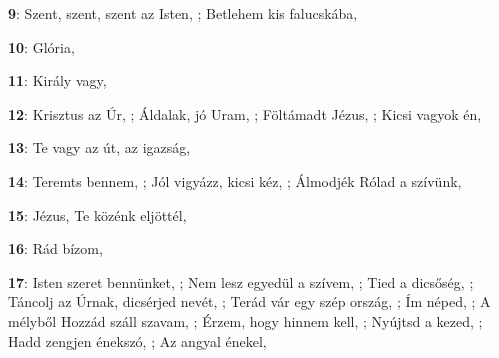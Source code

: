\begin{minipage}{0.5\textwidth}
\textbf{9}: Szent, szent, szent az Isten, \pageref{Szent2Cszent2CszentazIsten}; Betlehem kis falucskába, \pageref{BetlehemkisfalucskC3A1ba}
\end{minipage}\vspace{0.1cm}
\begin{minipage}{0.5\textwidth}
\textbf{10}: Glória, \pageref{GlC3B3ria}
\end{minipage}\vspace{0.1cm}
\begin{minipage}{0.5\textwidth}
\textbf{11}: Király vagy, \pageref{KirC3A1lyvagy}
\end{minipage}\vspace{0.1cm}
\begin{minipage}{0.5\textwidth}
\textbf{12}: Krisztus az Úr, \pageref{KrisztusazC39Ar}; Áldalak, jó Uram, \pageref{C381ldalak2CjC3B3Uram}; Föltámadt Jézus, \pageref{FC3B6ltC3A1madtJC3A9zus}; Kicsi vagyok én, \pageref{KicsivagyokC3A9n}
\end{minipage}\vspace{0.1cm}
\begin{minipage}{0.5\textwidth}
\textbf{13}: Te vagy az út, az igazság, \pageref{TevagyazC3BAt2CazigazsC3A1g}
\end{minipage}\vspace{0.1cm}
\begin{minipage}{0.5\textwidth}
\textbf{14}: Teremts bennem, \pageref{Teremtsbennem}; Jól vigyázz, kicsi kéz, \pageref{JC3B3lvigyC3A1zz2CkicsikC3A9z}; Álmodjék Rólad a szívünk, \pageref{C381lmodjC3A9kRC3B3ladaszC3ADvC3BCnk}
\end{minipage}\vspace{0.1cm}
\begin{minipage}{0.5\textwidth}
\textbf{15}: Jézus, Te közénk eljöttél, \pageref{JC3A9zus2CTekC3B6zC3A9nkeljC3B6ttC3A9l}
\end{minipage}\vspace{0.1cm}
\begin{minipage}{0.5\textwidth}
\textbf{16}: Rád bízom, \pageref{RC3A1dbC3ADzom}
\end{minipage}\vspace{0.1cm}
\begin{minipage}{0.5\textwidth}
\textbf{17}: Isten szeret bennünket, \pageref{IstenszeretbennC3BCnket}; Nem lesz egyedül a szívem, \pageref{NemleszegyedC3BClaszC3ADvem}; Tied a dicsőség, \pageref{TiedadicsC591sC3A9g}; Táncolj az Úrnak, dicsérjed nevét, \pageref{TC3A1ncoljazC39Arnak2CdicsC3A9rjednevC3A9t}; Terád vár egy szép ország, \pageref{TerC3A1dvC3A1regyszC3A9porszC3A1g}; Ím néped, \pageref{C38DmnC3A9ped}; A mélyből Hozzád száll szavam, \pageref{AmC3A9lybC591lHozzC3A1dszC3A1llszavam}; Érzem, hogy hinnem kell, \pageref{C389rzem2Chogyhinnemkell}; Nyújtsd a kezed, \pageref{NyC3BAjtsdakezed}; Hadd zengjen énekszó, \pageref{HaddzengjenC3A9nekszC3B3}; Az angyal énekel, \pageref{AzangyalC3A9nekel}
\end{minipage}\vspace{0.1cm}
